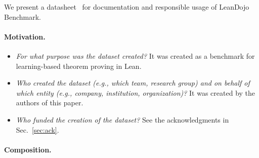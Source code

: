 \documentclass{article}
\newcommand{\smallsec}[1]{\vspace{-1mm} \paragraph{#1.}}
\begin{document}
We present a datasheet~\cite{gebru2021datasheets} for documentation and responsible usage of LeanDojo Benchmark.


\smallsec{Motivation}

\begin{itemize}[leftmargin=*]
\item \emph{For what purpose was the dataset created?} It was created as a benchmark for learning-based theorem proving in Lean.

\item \emph{Who created the dataset (e.g., which team, research group) and on behalf of which entity (e.g., company, institution, organization)?} It was created by the authors of this paper.

\item \emph{Who funded the creation of the dataset?} See the acknowledgments in Sec.~\ref{sec:ack}.

\end{itemize}

\smallsec{Composition}
\end{document}
